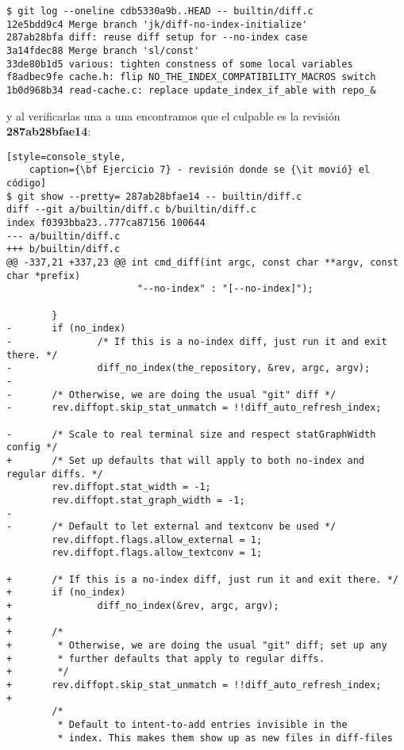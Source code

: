 \begin{lstlisting}[style=console_style,
	caption={\bf Ejercicio 7} - revisiones que verificar]
$ git log --oneline cdb5330a9b..HEAD -- builtin/diff.c
12e5bdd9c4 Merge branch 'jk/diff-no-index-initialize'
287ab28bfa diff: reuse diff setup for --no-index case
3a14fdec88 Merge branch 'sl/const'
33de80b1d5 various: tighten constness of some local variables
f8adbec9fe cache.h: flip NO_THE_INDEX_COMPATIBILITY_MACROS switch
1b0d968b34 read-cache.c: replace update_index_if_able with repo_&
\end{lstlisting}

y al verificarlas una a una encontramos que el culpable es la revisión {\bf 287ab28bfae14}:

\begin{lstlisting}[style=console_style,
	caption={\bf Ejercicio 7} - revisión donde se {\it movió} el código]
$ git show --pretty= 287ab28bfae14 -- builtin/diff.c
diff --git a/builtin/diff.c b/builtin/diff.c
index f0393bba23..777ca87156 100644
--- a/builtin/diff.c
+++ b/builtin/diff.c
@@ -337,21 +337,23 @@ int cmd_diff(int argc, const char **argv, const char *prefix)
                       "--no-index" : "[--no-index]");
 
        }
-       if (no_index)
-               /* If this is a no-index diff, just run it and exit there. */
-               diff_no_index(the_repository, &rev, argc, argv);
-
-       /* Otherwise, we are doing the usual "git" diff */
-       rev.diffopt.skip_stat_unmatch = !!diff_auto_refresh_index;
 
-       /* Scale to real terminal size and respect statGraphWidth config */
+       /* Set up defaults that will apply to both no-index and regular diffs. */
        rev.diffopt.stat_width = -1;
        rev.diffopt.stat_graph_width = -1;
-
-       /* Default to let external and textconv be used */
        rev.diffopt.flags.allow_external = 1;
        rev.diffopt.flags.allow_textconv = 1;
 
+       /* If this is a no-index diff, just run it and exit there. */
+       if (no_index)
+               diff_no_index(&rev, argc, argv);
+
+       /*
+        * Otherwise, we are doing the usual "git" diff; set up any
+        * further defaults that apply to regular diffs.
+        */
+       rev.diffopt.skip_stat_unmatch = !!diff_auto_refresh_index;
+
        /*
         * Default to intent-to-add entries invisible in the
         * index. This makes them show up as new files in diff-files
\end{lstlisting}

